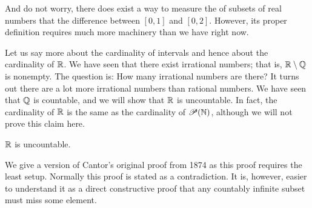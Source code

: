 And do not worry, there does exist a way to measure the  of subsets
of real numbers that
the difference between $[0,1]$ and $[0,2]$.  However, its proper definition
requires much more machinery than we have right now.

Let us say more about the cardinality of intervals and hence about the
cardinality of ${\mathbb{R}}$.  We have seen that there exist irrational numbers;
that is,
${\mathbb{R}} \setminus {\mathbb{Q}}$ is nonempty.  The question is: How many irrational numbers
are there?  It turns out there are a lot more irrational numbers than rational
numbers.  We have seen that ${\mathbb{Q}}$ is countable, and we will show
that ${\mathbb{R}}$ is uncountable.
In fact, the cardinality of ${\mathbb{R}}$ is the
same as the cardinality of ${\mathscr{P}}({\mathbb{N}})$, although we will not prove this
claim here.

\begin{thm}[Cantor]
${\mathbb{R}}$ is uncountable.
\end{thm}

We give a version of
Cantor's original proof from
1874 as this proof requires the least setup.  Normally this proof is stated
as a contradiction.  It is, however, easier
to understand it as a direct constructive proof that any countably infinite subset
must miss some element.

